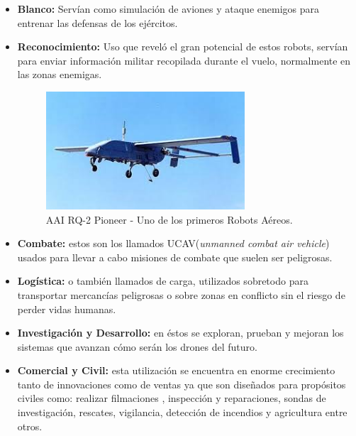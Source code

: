 \begin{itemize}
		\item \textbf{Blanco:} Servían como simulación de aviones y ataque enemigos para entrenar las defensas de los ejércitos.
		\item\textbf{Reconocimiento:} Uso que reveló el gran potencial de estos robots, servían para enviar información militar recopilada durante el vuelo, normalmente en las zonas enemigas. 
	\begin{figure}[H]
		\begin{center}
			\includegraphics[width=0.7\textwidth]{imag/IMG14.jpeg}
					\caption{AAI RQ-2 Pioneer - Uno de los primeros Robots Aéreos.}
		\label{fig:UAV Pioneer.}	
		\end{center}
	\end{figure}		
		
		\item \textbf{Combate:} estos son los llamados UCAV(\textit{unmanned combat air vehicle}) usados para llevar a cabo misiones de combate que suelen ser peligrosas.
		\item \textbf{Logística:} o también llamados de carga, utilizados sobretodo para transportar mercancías peligrosas o sobre zonas en conflicto sin el riesgo de perder vidas humanas.
		\item \textbf{Investigación y Desarrollo:} en éstos se exploran, prueban y mejoran los sistemas que avanzan cómo serán los drones del futuro.
		\item \textbf{Comercial y Civil:} esta utilización se encuentra en enorme crecimiento tanto de innovaciones como de ventas ya que son diseñados para propósitos civiles como: realizar filmaciones , inspección y reparaciones, sondas de investigación, rescates, vigilancia, detección de incendios y agricultura entre otros.
\end{itemize}

